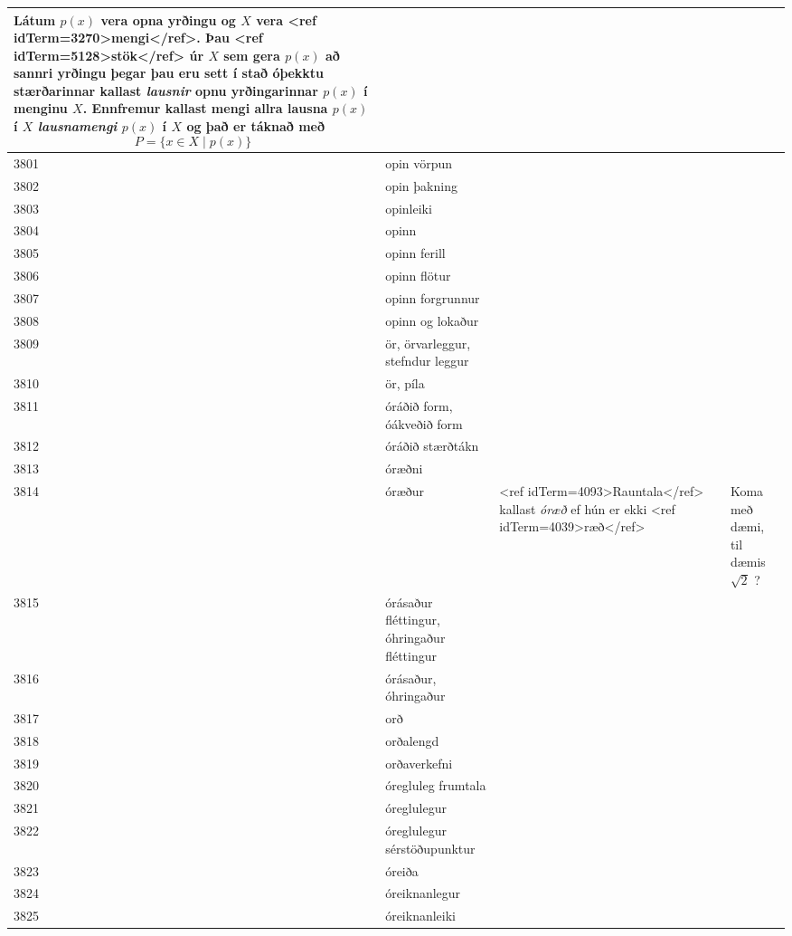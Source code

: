 \begin{longtable}{p{}|p{}|p{}|p{}|p{}}
Látum $p(x)$ vera opna yrðingu og $X$ vera <ref idTerm=3270>mengi</ref>. Þau <ref idTerm=5128>stök</ref> úr $X$ sem gera $p(x)$ að sannri yrðingu þegar þau eru sett í stað óþekktu stærðarinnar kallast \textit{lausnir} opnu yrðingarinnar $p(x)$ í menginu $X$. Ennfremur kallast mengi allra lausna $p(x)$ í $X$ \textit{lausnamengi} $p(x)$ í $X$ og það er táknað með \[ P = \{x \in X \mid p(x)\} \] & \\
\hline
3801 & opin vörpun &  &  &  \\
\hline
3802 & opin þakning &  &  &  \\
\hline
3803 & opinleiki &  &  &  \\
\hline
3804 & opinn &  &  &  \\
\hline
3805 & opinn ferill &  &  &  \\
\hline
3806 & opinn flötur &  &  &  \\
\hline
3807 & opinn forgrunnur &  &  &  \\
\hline
3808 & opinn og lokaður &  &  &  \\
\hline
3809 & ör, örvarleggur, stefndur leggur &  &  &  \\
\hline
3810 & ör, píla &  &  &  \\
\hline
3811 & óráðið form, óákveðið form &  &  &  \\
\hline
3812 & óráðið stærðtákn &  &  &  \\
\hline
3813 & óræðni &  &  &  \\
\hline
3814 & óræður & <ref idTerm=4093>Rauntala</ref> kallast \textit{óræð} ef hún er ekki <ref idTerm=4039>ræð</ref> &  & Koma með dæmi, til dæmis $\sqrt{2}$ ? \\
\hline
3815 & órásaður fléttingur, óhringaður fléttingur &  &  &  \\
\hline
3816 & órásaður, óhringaður &  &  &  \\
\hline
3817 & orð &  &  &  \\
\hline
3818 & orðalengd &  &  &  \\
\hline
3819 & orðaverkefni &  &  &  \\
\hline
3820 & óregluleg frumtala &  &  &  \\
\hline
3821 & óreglulegur &  &  &  \\
\hline
3822 & óreglulegur sérstöðupunktur &  &  &  \\
\hline
3823 & óreiða &  &  &  \\
\hline
3824 & óreiknanlegur &  &  &  \\
\hline
3825 & óreiknanleiki &  &  &  \\

\end{longtable}
